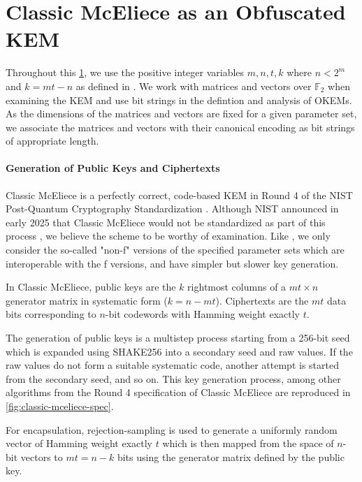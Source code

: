 \section{Classic McEliece as an Obfuscated KEM} \label{sec:obfuscating-classic-mceliece}

Throughout this \cref{sec:obfuscating-classic-mceliece}, we use the positive integer variables $m,n,t,k$ where $n < 2^m$ and $k=mt-n$ as defined in \cite{NISTPQC-R4:ClassicMcEliece22}. We work with matrices and vectors over $\mathbb F_2$ when examining the KEM and use bit strings in the defintion and analysis of OKEMs. As the dimensions of the matrices and vectors are fixed for a given parameter set, we associate the matrices and vectors with their canonical encoding as bit strings of appropriate length.

\paragraph{Generation of Public Keys and Ciphertexts}
Classic McEliece \cite{NISTPQC-R4:ClassicMcEliece22} is a perfectly correct, code-based KEM in Round 4 of the NIST Post-Quantum Cryptography Standardization \cite{nist-standardization}. Although NIST announced in early 2025 that Classic McEliece would not be standardized as part of this process \cite{nist-ir-8545}, we believe the scheme to be worthy of examination. Like \cite{EC:Xagawa22}, we only consider the so-called "non-f" versions of the specified parameter sets which are interoperable with the f versions, and have simpler but slower key generation.
 
In Classic McEliece, public keys are the $k$ rightmost columns of a $mt \times n$ generator matrix in systematic form ($k = n - mt$). Ciphertexts are the $mt$ data bits corresponding to $n$-bit codewords with Hamming weight exactly $t$.

The generation of public keys is a multistep process starting from a 256-bit seed which is expanded using SHAKE256 into a secondary seed and raw values. If the raw values do not form a suitable systematic code, another attempt is started from the secondary seed, and so on. This key generation process, among other algorithms from the Round 4 specification of Classic McEliece are reproduced in \cref{fig:classic-mceliece-spec}.

For encapsulation, rejection-sampling is used to generate a uniformly random vector of Hamming weight exactly $t$ which is then mapped from the space of $n$-bit vectors to $mt=n-k$ bits using the generator matrix defined by the public key.

